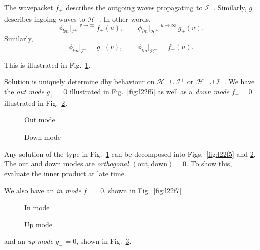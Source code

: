 The wavepacket $f_+$ describes the outgoing waves propagating to $\mathscr{I}^+$.
Similarly, $g_+$ describes ingoing waves to $\mathcal{H}^+$.
In other words,
\begin{equation}
  \phi_{lm}\rvert_{\mathscr{I}^+} \stackrel{v \to \infty}{=} f_+(u), \qquad \phi_{lm}\rvert_{\mathcal{H}^+} \stackrel{u \to \infty}{=} g_+(v).
\end{equation}
Similarly,
\begin{equation}
  \phi_{lm}\rvert_{\mathscr{I}^-} = g_-(v), \qquad \phi_{lm}\rvert_{\mathcal{H}^-} = f_-(u).
\end{equation}

This is illustrated in Fig.~\ref{fig:l22f4}.
\begin{figure}[ht]
  \centering
  \caption{}
  \label{fig:l22f4}
\end{figure}

Solution is uniquely determine dby behaviour on $\mathcal{H}^+ \cup \mathscr{I}^+$ or $\mathcal{H}^- \cup \mathscr{I}^-$.
We have the \emph{out mode} $g_+ = 0$ illustrated in Fig.~\ref{fig:l22f5} as well as a \emph{down mode} $f_+ = 0$ illustrated in Fig.~\ref{fig:l22f6}.
\begin{figure}[tbhp]
  \begin{minipage}[t]{0.5\textwidth}
    \centering
    \caption{Out mode}
    \label{fig:l22f5}
  \end{minipage}%
  \begin{minipage}[t]{0.5\textwidth}
    \centering
    \def\svgwidth{0.5\columnwidth}
    
    \caption{Down mode}
    \label{fig:l22f6}
  \end{minipage}
\end{figure}
Any solution of the type in Fig.~\ref{fig:l22f4} can be decomposed into Figs.~\ref{fig:l22f5} and \ref{fig:l22f6}.
The out and down modes are \emph{orthogonal} $(\text{out}, \text{down}) = 0$. To show this, evaluate the inner product at late time.

We also have an \emph{in mode} $f_- = 0$, shown in Fig.~\ref{fig:l22f7}
\begin{figure}[ht]
  \begin{minipage}[t]{0.5\textwidth}
    \centering
    \caption{In mode}
    \label{fig:l22f7}
  \end{minipage}%
  \begin{minipage}[t]{0.5\textwidth}
    \centering
    \def\svgwidth{0.8\columnwidth}
    
    \caption{Up mode}
    \label{fig:l22f8}
  \end{minipage}
\end{figure}
and an \emph{up mode} $g_- = 0$, shown in Fig.~\ref{fig:l22f8}.


